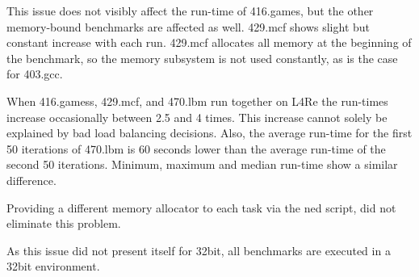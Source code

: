 This issue does not visibly affect the run-time of 416.games, but the other memory-bound
benchmarks are affected as well.
429.mcf shows slight but constant increase with each run.
429.mcf allocates all memory at the beginning of the benchmark, so the memory
subsystem is not used constantly, as is the case for 403.gcc.

When 416.gamess, 429.mcf, and 470.lbm run together on L4Re the run-times
increase occasionally between 2.5 and 4 times.
This increase cannot solely be explained by bad load balancing decisions.
Also, the average run-time for the first 50 iterations of 470.lbm is 60 seconds
lower than the average run-time of the second 50 iterations.
Minimum, maximum and median run-time show a similar difference.

Providing a different memory allocator to each task via the ned script,
did not eliminate this problem.

As this issue did not present itself for 32bit, all benchmarks are executed
in a 32bit environment.


\begin{comment}
\paragraph{Benchmarks.}
SPEC progs:
solo runs: SLD, STB, MIPC, CFS
group runs: SLD, STB, MIPC, CFS
--> degradation of median compared  to solo runs

Group runs for different SMT algos: RR, load,
Group runs for different MIPC assignments: load, mpc-ipc

pingpong  clsvr group;
openmp-mmul distribution group; -- load generated by other mmul or fractal



\paragraph{Group Configuration Benchmarks}
The first is a simple \gls{ipc} ping-pong, where the server answers a call from
the client with the number of the core it is currently running on.
The client measures the time for the \gls{ipc} call and prints the answer of
the server together with its own core number and the \gls{ipc} duration.

\end{comment}
